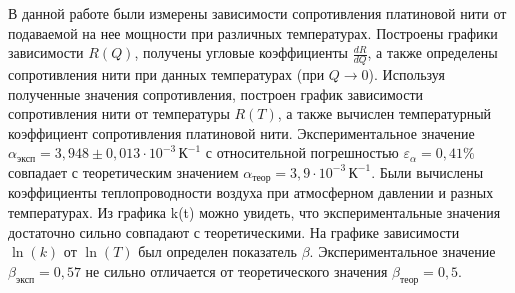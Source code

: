 \documentclass[a4paper,12pt]{article}
\begin{document}
             В данной работе были измерены зависимости сопротивления платиновой нити от подаваемой на нее мощности при различных температурах. Построены графики зависимости $R(Q)$, получены угловые коэффициенты $\frac{dR}{dQ}$, а также определены сопротивления нити при данных температурах (при $Q \rightarrow 0$).
               Используя полученные значения сопротивления, построен график зависимости сопротивления нити от температуры $R(T)$, а также вычислен температурный коэффициент сопротивления платиновой нити. Экспериментальное значение $\alpha_{\text{эксп}} = 3,948 \pm 0,013 \cdot 10^{-3} \, \text{К}^{-1}$ с относительной погрешностью $\varepsilon_{\alpha} = 0,41\%$ совпадает с теоретическим значением $\alpha_{\text{теор}} = 3,9 \cdot 10^{-3} \, \text{К}^{-1}$.     Были вычислены коэффициенты теплопроводности воздуха при атмосферном давлении и разных температурах. Из графика k(t) можно увидеть, что экспериментальные значения достаточно сильно совпадают с теоретическими.               На графике зависимости $\ln(k)$ от $\ln(T)$ был определен показатель $\beta$. Экспериментальное значение $\beta_{\text{эксп}} = 0,57$ не сильно отличается от теоретического значения $\beta_{\text{теор}} = 0,5$.
\end{document}
